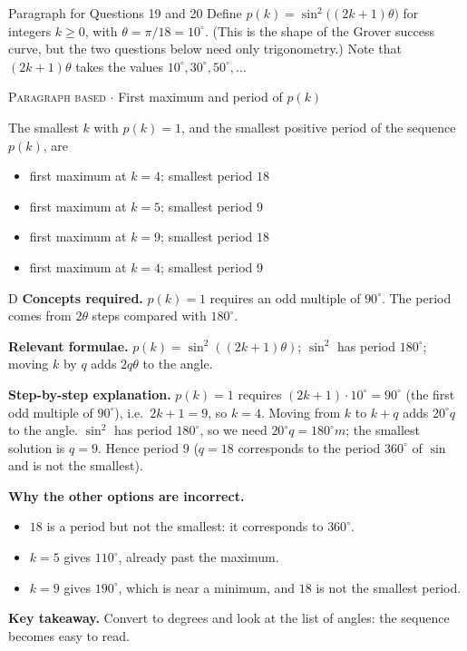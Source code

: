 \documentclass[11pt,a4paper]{article}
\newcommand{\optlabel}[1]{\textbf{(#1)}}
\newcommand{\correctlabel}[1]{\textcolor{okgreen}{\textbf{(#1)}\,\ding{51}}}
\newenvironment{qitem}[1]{\begin{list}{}{\setlength{\leftmargin}{3.3em}\setlength{\labelwidth}{3.1em}%
  \setlength{\labelsep}{0.2em}\setlength{\topsep}{3pt}\setlength{\parsep}{3pt}}\item[\textbf{Q.#1}\hfill]}{\end{list}}
\newcommand{\qsep}{\par\vspace{2pt}{\color{black!15}\hrule}\vspace{4pt}}
\newcommand{\qmeta}[2]{{\footnotesize\color{black!60}\textsc{#1} \;$\cdot$\; #2}\par}
\begin{document}
\begin{passagebox}{Paragraph for Questions 19 and 20}
Define $p(k) = \sin^2\big((2k+1)\theta\big)$ for integers $k \ge 0$, with $\theta = \pi/18 = 10^\circ$. (This is the
shape of the Grover success curve, but the two questions below need only trigonometry.) Note that $(2k+1)\theta$ takes the
values $10^\circ, 30^\circ, 50^\circ, \dots$
\end{passagebox}
\begin{qitem}{19}
\qmeta{Paragraph based}{First maximum and period of $p(k)$}
The smallest $k$ with $p(k) = 1$, and the smallest positive period of the sequence $p(k)$, are
\begin{itemize}[leftmargin=2.6em, labelsep=0.4em, itemsep=2pt, topsep=3pt]
\item[\optlabel{A}] first maximum at $k = 4$; smallest period $18$
\item[\optlabel{B}] first maximum at $k = 5$; smallest period $9$
\item[\optlabel{C}] first maximum at $k = 9$; smallest period $18$
\item[\correctlabel{D}] first maximum at $k = 4$; smallest period $9$
\end{itemize}
\end{qitem}
\begin{solbox}{D}
\textbf{\color{brand}Concepts required.} $p(k) = 1$ requires an odd multiple of $90^\circ$. The period comes from $2\theta$ steps compared with $180^\circ$.

\textbf{\color{brand}Relevant formulae.} $p(k) = \sin^2((2k+1)\theta)$; $\sin^2$ has period $180^\circ$; moving $k$ by $q$ adds $2q\theta$ to the angle.

\textbf{\color{brand}Step-by-step explanation.} $p(k) = 1$ requires $(2k+1)\cdot 10^\circ = 90^\circ$ (the first odd multiple of $90^\circ$), i.e.\ $2k + 1 = 9$, so $k = 4$.
Moving from $k$ to $k + q$ adds $20^\circ q$ to the angle. $\sin^2$ has period $180^\circ$, so we need $20^\circ q = 180^\circ m$; the smallest
solution is $q = 9$. Hence period $9$ ($q = 18$ corresponds to the period $360^\circ$ of $\sin$ and is not the smallest).

\textbf{\color{brand}Why the other options are incorrect.}
\begin{itemize}[leftmargin=2.4em, itemsep=1pt, topsep=2pt]
\item[\textbf{(A)}] $18$ is a period but not the smallest: it corresponds to $360^\circ$.
\item[\textbf{(B)}] $k = 5$ gives $110^\circ$, already past the maximum.
\item[\textbf{(C)}] $k = 9$ gives $190^\circ$, which is near a minimum, and $18$ is not the smallest period.
\end{itemize}
\textbf{\color{brand}Key takeaway.} Convert to degrees and look at the list of angles: the sequence becomes easy to read.
\end{solbox}
\qsep
\end{document}
